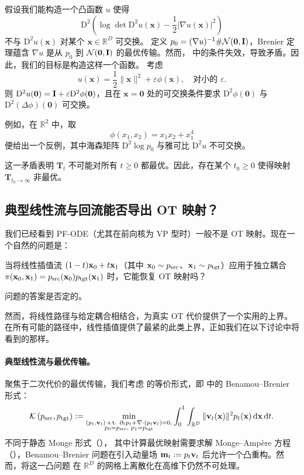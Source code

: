假设我们能构造一个凸函数 $u$ 使得  
\[
\mathrm{D}^2 \left( \log \det \mathrm{D}^2 u(\mathbf{x}) - \frac{1}{2} \lvert \nabla u(\mathbf{x}) \rvert^2 \right)
\]
不与 $\mathrm{D}^2 u(\mathbf{x})$ 对某个 $\mathbf{x} \in \mathbb{R}^D$ 可交换。  定义 $p_0 = (\nabla u)^{-1} \# \mathcal{N}(\bm{0}, {\mathbf{I}})$，Brenier 定理蕴含 $\nabla u$ 是从 $p_0$ 到 $\mathcal{N}(\bm{0}, {\mathbf{I}})$ 的最优传输。然而， 中的条件失效，导致矛盾。因此，我们的目标是构造这样一个函数。 
考虑  
\[
u(\mathbf{x}) = \frac{1}{2} \|\mathbf{x}\|^2 + \varepsilon \phi(\mathbf{x}), \quad \text{对小的 } \varepsilon.
\]
则 $\mathrm{D}^2 u(\mathbf{0}) = {\mathbf{I}} + \varepsilon \mathrm{D}^2 \phi(\mathbf{0})$，且在 $\mathbf{x} = \mathbf{0}$ 处的可交换条件要求 $\mathrm{D}^2 \phi(\mathbf{0})$ 与 $\mathrm{D}^2 (\Delta \phi)(\mathbf{0})$ 可交换。 

例如，在 $\mathbb{R}^2$ 中，取  
\[
\phi(x_1, x_2) = x_1 x_2 + x_1^4
\]
便给出一个反例，其中海森矩阵 $\mathrm{D}^2 \log p_0$ 与雅可比 $\mathrm{D}^2 u$ 不可交换。

这一矛盾表明 $\mathbf{T}_t$ 不可能对所有 $t \geq 0$ 都最优。因此，存在某个 $t_0 \geq 0$ 使得映射 $\mathbf{T}_{t_0 \to \infty}$ 非最优。

\newpage 

\subsection{典型线性流与回流能否导出 OT 映射？}\label{subsec:ot-linear-reflow} 
我们已经看到 PF-ODE（尤其在前向核为 VP 型时）一般不是 OT 映射。现在一个自然的问题是：
\begin{question}
当将线性插值流 $(1-t){\mathbf{x}}_0 + t {\mathbf{x}}_1$（其中 ${\mathbf{x}}_0\sim p_{\mathrm{src}}$、${\mathbf{x}}_1\sim p_{\mathrm{tgt}}$）应用于独立耦合 $\pi({\mathbf{x}}_0, {\mathbf{x}}_1) = p_{\mathrm{src}}({\mathbf{x}}_0)p_{\mathrm{tgt}}({\mathbf{x}}_1)$ 时，它能恢复 OT 映射吗？
\end{question}
问题的答案是否定的。
 
然而，将线性路径与给定耦合相结合，为真实 OT 代价提供了一个实用的上界。  在所有可能的路径中，线性插值提供了最紧的此类上界，正如我们在以下讨论中将看到的那样。


\paragraph{典型线性流与最优传输。}
聚焦于二次代价的最优传输，我们考虑  的等价形式，即  中的 Benamou--Brenier 形式：
\begin{equation*}
    \mathcal{K}\left(p_{\mathrm{src}}, p_{\mathrm{tgt}}\right) :=  \min_{\substack{ (p_t, {\mathbf{v}}_t) \text{ s.t. }
        \partial_t p_t + \nabla \cdot (p_t {\mathbf{v}}_t) = 0, \\
        p_0 = p_{\mathrm{src}},\,\, p_1 = p_{\mathrm{tgt}}
    }}
    \int_0^1 \int_{\mathbb{R}^D} \|{\mathbf{v}}_t({\mathbf{x}})\|^2 p_t({\mathbf{x}}) \mathop{}\!\mathrm{d}{\mathbf{x}} \mathop{}\!\mathrm{d} t.
\end{equation*}
不同于静态 Monge 形式（），
其中计算最优映射需要求解 Monge--Amp\`ere
方程（），Benamou--Brenier 问题在引入动量场
${\mathbf{m}}_t := p_t {\mathbf{v}}_t$ 后允许一个凸重构。然而，将这一凸问题
在 $\mathbb{R}^D$ 的网格上离散化在高维下仍然不可处理。




